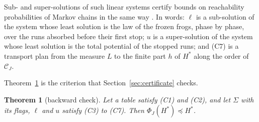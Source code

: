 \documentclass[11pt]{amsart}
\newtheorem{theorem}{Theorem}[section]
\theoremstyle{definition}
\numberwithin{equation}{section}
\newcommand{\lean}[1]{\ignorespaces}
\newcommand{\cC}{\mathcal{C}}
\newcommand{\stle}{\preceq}
\begin{document}
Sub- and super-solutions of such linear systems certify bounds on reachability probabilities of Markov chains in the same way \cite[Propositions~3 and~4]{CQSWWZ25}. In words: $\ell$ is a sub-solution of the system whose least solution is the law of the frozen frogs, phase by phase, over the runs absorbed before their first stop; $u$ is a super-solution of the system whose least solution is the total potential of the stopped runs; and (C7) is a transport plan from the measure $L$ to the finite part $h$ of $H^*$ along the order of $\cC_J$.

Theorem~\ref{thm:check} is the criterion that Section~\ref{sec:certificate} checks.

\begin{theorem}[backward check]\label{thm:check}\lean{FrogModel.Engine.G3.phiSuper_of_check, FrogModel.LemmaX.lemma62_holds, FrogModel.LemmaX.Lemma62, FrogModel.Engine.domSplit_of_domCert, FrogModel.Engine.G3.domCert_of_check, FrogModel.Order.quantile_coupling, FrogModel.Cert.inv_theta_pow_le, FrogModel.LemmaX.PhiSuper}
Let a table satisfy (C1) and (C2), and let $\Sigma$ with its flags, $\ell$ and $u$ satisfy (C3) to (C7). Then $\Phi_J(H^*)\stle H^*$.
\end{theorem}
\end{document}
